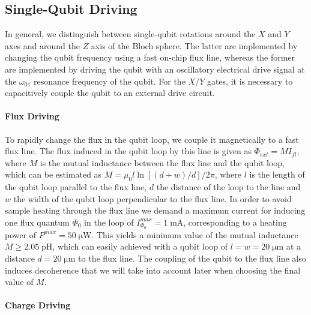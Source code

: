 \subsection{Single-Qubit Driving}

In general, we distinguish between single-qubit rotations around the $X$ and $Y$ axes and around the $Z$ axis of the Bloch sphere. The latter are implemented by changing the qubit frequency using a fast on-chip flux line, whereas the former are implemented by driving the qubit with an oscillatory electrical drive signal at the $\omega_{01}$ resonance frequency of the qubit. For the $X/Y$ gates, it is necessary to capacitively couple the qubit to an external drive circuit. 

\paragraph{Flux Driving}

To rapidly change the flux in the qubit loop, we couple it magnetically to a fast flux line. The flux induced in the qubit loop by this line is given as $\Phi_{ext}=M I_{fl}$, where $M$ is the mutual inductance between the flux line and the qubit loop, which can be estimated as $M=\mu_0 l \ln{\left[(d+w)/d\right]}/2\pi$, where $l$ is the length of the qubit loop parallel to the flux line, $d$ the distance of the loop to the line and $w$ the width of the qubit loop perpendicular to the flux line. In order to avoid sample heating through the flux line we demand a maximum current for inducing one flux quantum $\Phi_0$ in the loop of $I_{\Phi_0}^{max}=1\;\mathrm{mA}$, corresponding to a heating power of $P^{max}=50\;\mathrm{\mu W}$. This yields a minimum value of the mutual inductance $M\ge 2.05\;\mathrm{pH}$, which can easily achieved with a qubit loop of $l=w=20\;\mathrm{\mu m}$ at a distance $d=20\;\mathrm{\mu m}$ to the flux line. The coupling of the qubit to the flux line also induces decoherence that we will take into account later when choosing the final value of $M$.

\paragraph{Charge Driving}

